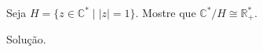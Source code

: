 \begin{homeworkProblem}
  Seja $H = \{z \in \mathbb{C}^* \mid |z| = 1\}$. Mostre que $\mathbb{C}^* / H \cong \mathbb{R}_+^*$.
  \begin{solution}
    Solução.
  \end{solution}
\end{homeworkProblem}
